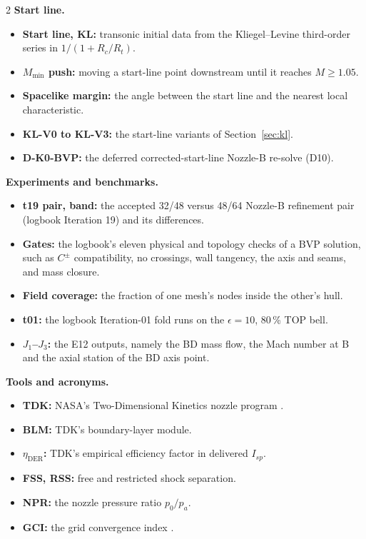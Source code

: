 \begin{multicols}{2}
\textbf{Start line.}
\begin{itemize}
\item \textbf{Start line, KL:} transonic initial data from the Kliegel--Levine
third-order series in $1/(1+R_c/R_t)$.
\item \textbf{$M_{\min}$ push:} moving a start-line point downstream until it reaches
$M\ge1.05$.
\item \textbf{Spacelike margin:} the angle between the start line and the nearest
local characteristic.
\item \textbf{KL-V0 to KL-V3:} the start-line variants of Section~\ref{sec:kl}.
\item \textbf{D-K0-BVP:} the deferred corrected-start-line Nozzle-B re-solve (D10).
\end{itemize}

\textbf{Experiments and benchmarks.}
\begin{itemize}
\item \textbf{t19 pair, band:} the accepted 32/48 versus 48/64 Nozzle-B refinement
pair (logbook Iteration 19) and its differences.
\item \textbf{Gates:} the logbook's eleven physical and topology checks of a BVP
solution, such as $C^\pm$ compatibility, no crossings, wall tangency, the axis and
seams, and mass closure.
\item \textbf{Field coverage:} the fraction of one mesh's nodes inside the other's
hull.
\item \textbf{t01:} the logbook Iteration-01 fold runs on the $\epsilon=10$, 80\,\% TOP
bell.
\item \textbf{$J_1$--$J_3$:} the E12 outputs, namely the BD mass flow, the Mach number
at B and the axial station of the BD axis point.
\end{itemize}

\textbf{Tools and acronyms.}
\begin{itemize}
\item \textbf{TDK:} NASA's Two-Dimensional Kinetics nozzle program \cite{nickerson1985}.
\item \textbf{BLM:} TDK's boundary-layer module.
\item \textbf{$\eta_{\mathrm{DER}}$:} TDK's empirical efficiency factor in delivered
$I_{sp}$.
\item \textbf{FSS, RSS:} free and restricted shock separation.
\item \textbf{NPR:} the nozzle pressure ratio $p_0/p_a$.
\item \textbf{GCI:} the grid convergence index \cite{celik2008}.
\end{itemize}
\end{multicols}
\endgroup
